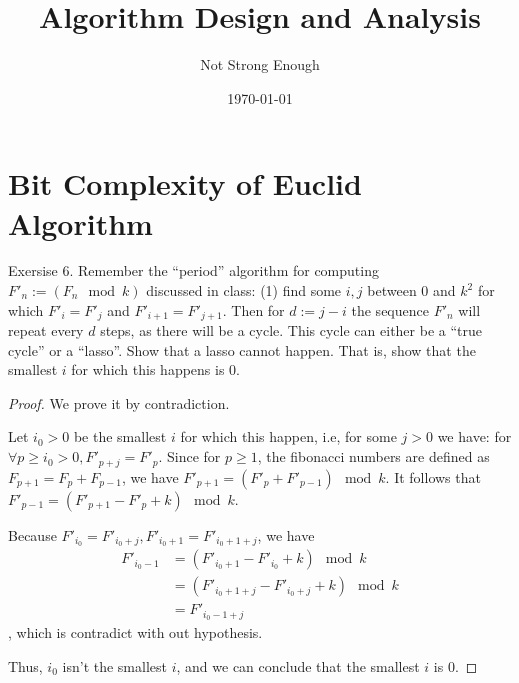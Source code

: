 \documentclass[UTF8, a4paper, linespread=1.5]{article}
\title{Algorithm Design and Analysis}
\date{\today}
\author{Not Strong Enough}
\begin{document}
\maketitle

\section{Bit Complexity of Euclid Algorithm}

\begin{thm}{Exersise 6.}{}
    Remember the ``period'' algorithm for computing $F'_n := (F_n \mod k)$ discussed in class: (1) find some $i,j$ between $0$ and $k^2$ for which $F'_{i} =  F'_{j}$ and $F'_{i+1} = F'_{j+1}$. Then for $d := j-i$ the sequence $F'_{n}$ will repeat every $d$ steps, as there will be a cycle. This cycle can either be a ``true cycle'' or a ``lasso''. Show that a lasso cannot happen. That is, show that the smallest $i$ for which this happens is $0$.
\end{thm}

\begin{proof}
    We prove it by contradiction.
    
    Let $i_0 > 0$ be the smallest $i$ for which this happen, i.e, for some $j > 0$ we have: for $\forall p \geqslant i_0 > 0, F'_{p + j} = F'_p$. Since for $p \geqslant 1$, the fibonacci numbers are defined as $F_{p + 1} = F_{p} + F_{p - 1}$, we have $F'_{p + 1} = (F'_p + F'_{p - 1}) \mod k$. It follows that $F'_{p - 1} = (F'_{p + 1} - F'_p + k) \mod k$.
    
    Because $F'_{i_0} = F'_{i_0 + j}, F'_{i_0 + 1} = F'_{i_0 + 1 + j}$, we have
    \begin{align*}
        F'_{i_0 - 1} &= (F'_{i_0 + 1} - F'_{i_0} + k) \mod k \\
        &= (F'_{i_0 + 1 + j} - F'_{i_0 + j} + k) \mod k \\
        &= F'_{i_0 - 1 + j}
    \end{align*}
    , which is contradict with out hypothesis.
    
    Thus, $i_0$ isn't the smallest $i$, and we can conclude that the smallest $i$ is $0$.
\end{proof}
\end{document}
